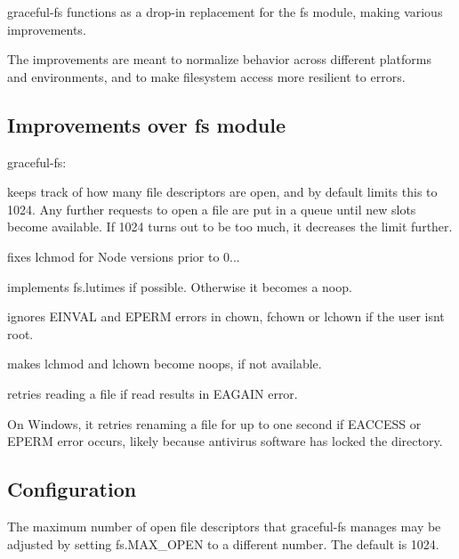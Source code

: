 graceful-\/fs functions as a drop-\/in replacement for the fs module, making various improvements.

The improvements are meant to normalize behavior across different platforms and environments, and to make filesystem access more resilient to errors.

\subsection*{Improvements over fs module}

graceful-\/fs\+:


\begin{DoxyItemize}
\item keeps track of how many file descriptors are open, and by default limits this to 1024. Any further requests to open a file are put in a queue until new slots become available. If 1024 turns out to be too much, it decreases the limit further.
\item fixes {\ttfamily lchmod} for Node versions prior to 0...
\item implements {\ttfamily fs.\+lutimes} if possible. Otherwise it becomes a noop.
\item ignores {\ttfamily E\+I\+N\+V\+A\+L} and {\ttfamily E\+P\+E\+R\+M} errors in {\ttfamily chown}, {\ttfamily fchown} or {\ttfamily lchown} if the user isn\textquotesingle{}t root.
\item makes {\ttfamily lchmod} and {\ttfamily lchown} become noops, if not available.
\item retries reading a file if {\ttfamily read} results in E\+A\+G\+A\+I\+N error.
\end{DoxyItemize}

On Windows, it retries renaming a file for up to one second if {\ttfamily E\+A\+C\+C\+E\+S\+S} or {\ttfamily E\+P\+E\+R\+M} error occurs, likely because antivirus software has locked the directory.

\subsection*{Configuration}

The maximum number of open file descriptors that graceful-\/fs manages may be adjusted by setting {\ttfamily fs.\+M\+A\+X\+\_\+\+O\+P\+E\+N} to a different number. The default is 1024. 